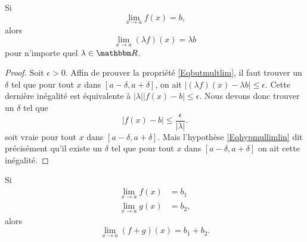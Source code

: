 \begin{theorem}		\label{ThoLimLinMul}
	Si
	\begin{equation} \label{Eqhypmullimlin}
	  \lim_{x\to a}f(x)=b,
	\end{equation}
	alors
	\begin{equation} \label{Eqbutmultlim}
	  \lim_{x\to a}(\lambda f)(x)=\lambda b
	\end{equation}
	pour n'importe quel $\lambda\in\eR$.
\end{theorem}

\begin{proof}
Soit $\epsilon>0$. Affin de prouver la propriété \eqref{Eqbutmultlim}, il faut trouver un $\delta$ tel que pour tout $x$ dans $[a-\delta,a+\delta]$, on ait $| (\lambda f)(x)- \lambda b |\leq\epsilon$. Cette dernière inégalité est équivalente à $|\lambda|| f(x)-b |\leq\epsilon$. Nous devons donc trouver un $\delta$ tel que 
\begin{equation} 
| f(x)-b |\leq\frac{ \epsilon }{ | \lambda | }.
\end{equation}
soit vraie pour tout $x$ dans $[a-\delta,a+\delta]$. Mais l'hypothèse \eqref{Eqhypmullimlin} dit précisément qu'il existe un $\delta$ tel que pour tout $x$ dans $[a-\delta,a+\delta]$ on ait cette inégalité. 
\end{proof}

\begin{theorem}		\label{ThoLimLin}
	Si
	\begin{subequations}
	\begin{align}
		\lim_{x\to a}f(x)&=b_1\\
		\lim_{x\to a}g(x)&=b_2,
	\end{align}
	\end{subequations}
	alors
	\begin{equation}
		\lim_{x\to a}(f+g)(x)=b_1+b_2.
	\end{equation}
\end{theorem}

